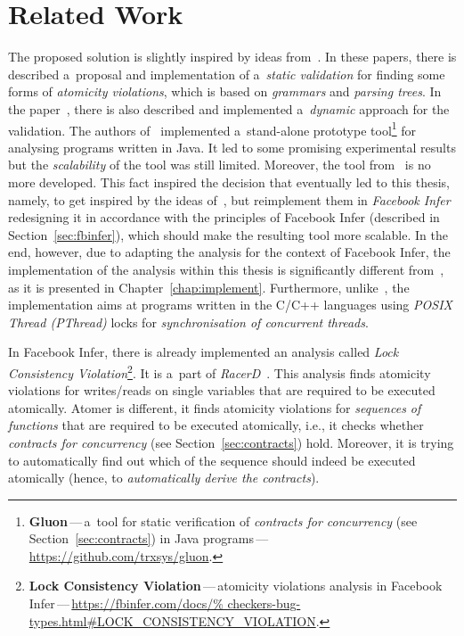 \section{Related Work}
\label{sec:relWork}

The proposed solution is slightly inspired by ideas from~\cite{contracts2017,
contracts2015}. In these papers, there is described a~proposal and 
implementation of a~\emph{static validation} for finding some forms of
\emph{atomicity violations}, which is based on \emph{grammars} and
\emph{parsing trees}. In the paper~\cite{contracts2017}, there is also 
described and implemented a~\emph{dynamic} approach for the validation. The
authors of~\cite{contracts2017, contracts2015} implemented a~stand-alone
prototype tool\footnote{\textbf{Gluon}\,---\,a~tool for static verification of
\emph{contracts for concurrency} (see Section~\ref{sec:contracts}) in Java
programs\,---\,\url{https://github.com/trxsys/gluon}.} for analysing programs
written in Java. It led to some promising experimental results but the
\emph{scalability} of the tool was still limited. Moreover, the tool
from~\cite{contracts2017, contracts2015} is no more developed. This
fact inspired the decision that eventually led to this thesis, namely, to
get inspired by the ideas of~\cite{contracts2017, contracts2015}, but
reimplement them in \emph{Facebook Infer} redesigning it in accordance 
with the principles of Facebook Infer (described in 
Section~\ref{sec:fbinfer}), which should make the resulting tool more 
scalable. In the end, however, due to adapting the analysis for the context 
of Facebook Infer, the implementation of the analysis within this thesis is
significantly different from~\cite{contracts2017, contracts2015}, as it is
presented in Chapter~\ref{chap:implement}. Furthermore,
unlike~\cite{contracts2017, contracts2015}, the implementation aims at 
programs written in the C/C++ languages using \emph{POSIX Thread (PThread)} 
locks for \emph{synchronisation of concurrent threads}.

In Facebook Infer, there is already implemented an analysis called
\emph{Lock Consistency Violation}\footnote{\textbf{Lock Consistency
Violation}\,---\,atomicity violations analysis in Facebook
Infer\,---\,\url{https://fbinfer.com/docs/%
checkers-bug-types.html\#LOCK_CONSISTENCY_VIOLATION}.}. It is a~part of
\emph{RacerD}~\cite{racerD, racerDOnline, staticRaceDetectorTruePositive}. 
This analysis finds atomicity violations for writes/reads on single 
variables that are required to be executed atomically. Atomer is different, 
it finds atomicity violations for \emph{sequences of functions} that are 
required to be executed atomically, i.e., it checks whether \emph{contracts 
for concurrency} (see Section~\ref{sec:contracts}) hold. Moreover, it is 
trying to automatically find out which of the sequence should indeed 
be executed atomically (hence, to \emph{automatically derive the
contracts}).


